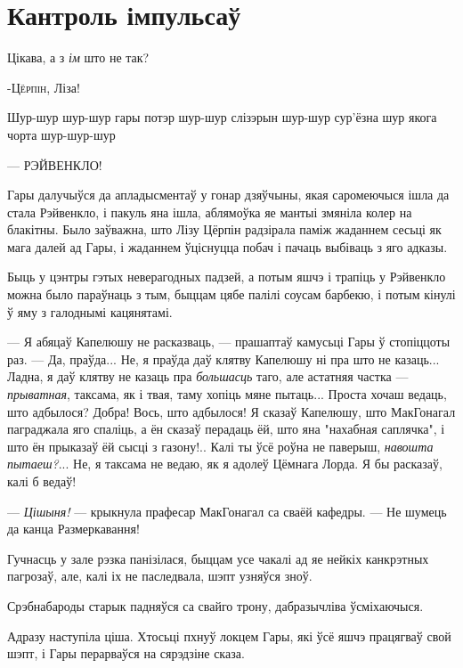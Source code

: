 \chapter{Кантроль імпульсаў}


\begin{chapterOpeningQuote}
Цікава, а з \emph{ім} што не так?
\end{chapterOpeningQuote}

\lettrine[lines=1,lraise=-0.1]{-Ц}{ёрпін,} Ліза!

Шур-шур  шур-шур гары потэр шур-шур слізэрын шур-шур сур'ёзна шур якога чорта шур-шур-шур

--- РЭЙВЕНКЛО!

Гары далучыўся да апладысментаў у гонар дзяўчыны, якая саромеючыся ішла да стала Рэйвенкло,
і пакуль яна ішла, аблямоўка яе мантыі змяніла колер на блакітны. Было заўважна, што Лізу Цёрпін
радзірала паміж жаданнем сесьці як мага далей ад Гары, і жаданнем ўціснуцца побач і пачаць
выбіваць з яго адказы.

Быць у цэнтры гэтых неверагодных падзей, а потым яшчэ і трапіць у Рэйвенкло можна было 
параўнаць з тым, быццам цябе палілі соусам барбекю, і потым кінулі ў яму з 
галоднымі кацянятамі.

--- Я абяцаў Капелюшу не расказваць, --- прашаптаў камусьці Гары ў стопіццоты раз. --- 
Да, праўда... Не, я праўда даў клятву Капелюшу ні пра што не казаць... Ладна, 
я даў клятву не казаць пра \emph{большасць} таго, але астатняя частка --- 
\emph{прыватная}, таксама, як і твая, таму хопіць мяне пытаць... 
Проста хочаш ведаць, што адбылося? Добра! Вось, што адбылося! Я сказаў Капелюшу,
што МакГонагал паграджала яго спаліць, а ён сказаў перадаць ёй, што яна 
"нахабная саплячка", і што ён прыказаў ёй сысці з газону!.. 
Калі ты ўсё роўна не паверыш, \emph{навошта пытаеш?}... Не,
я таксама не ведаю, як я адолеў Цёмнага Лорда. Я бы расказаў, калі б ведаў!

--- \emph{Цішыня!} --- крыкнула прафесар МакГонагал са сваёй кафедры. --- 
Не шумець да канца Размеркавання! 

Гучнасць у зале рэзка панізілася, быццам усе чакалі ад яе нейкіх канкрэтных пагрозаў,
але, калі іх не паследвала, шэпт узняўся зноў.

Срэбнабароды старык падняўся са свайго трону, дабразычліва ўсміхаючыся.

Адразу наступіла ціша. Хтосьці пхнуў локцем Гары, які ўсё яшчэ працягваў 
свой шэпт, і Гары перарваўся на сярэдзіне сказа.


